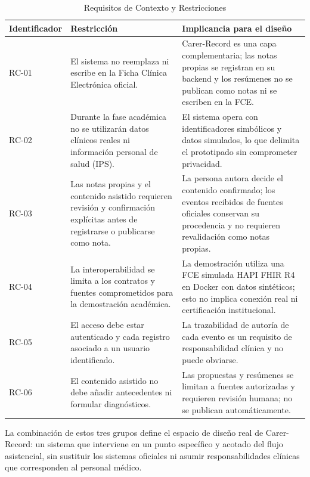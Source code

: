\begin{table}[H]
\caption{Requisitos de Contexto y Restricciones}
\label{tab:restricciones_contexto}
\begin{tabularx}{\textwidth}{|l|X|X|}
\hline
Identificador & \textbf{Restricción} & \textbf{Implicancia para el diseño} \\
\hline
RC-01 & El sistema no reemplaza ni escribe en la Ficha Clínica Electrónica oficial. & Carer-Record es una capa complementaria; las notas propias se registran en su backend y los resúmenes no se publican como notas ni se escriben en la FCE. \\
\hline
RC-02 & Durante la fase académica no se utilizarán datos clínicos reales ni información personal de salud (IPS). & El sistema opera con identificadores simbólicos y datos simulados, lo que delimita el prototipado sin comprometer privacidad. \\
\hline
RC-03 & Las notas propias y el contenido asistido requieren revisión y confirmación explícitas antes de registrarse o publicarse como nota. & La persona autora decide el contenido confirmado; los eventos recibidos de fuentes oficiales conservan su procedencia y no requieren revalidación como notas propias. \\
\hline
RC-04 & La interoperabilidad se limita a los contratos y fuentes comprometidos para la demostración académica. & La demostración utiliza una FCE simulada HAPI FHIR R4 en Docker con datos sintéticos; esto no implica conexión real ni certificación institucional. \\
\hline
RC-05 & El acceso debe estar autenticado y cada registro asociado a un usuario identificado. & La trazabilidad de autoría de cada evento es un requisito de responsabilidad clínica y no puede obviarse. \\
\hline
RC-06 & El contenido asistido no debe añadir antecedentes ni formular diagnósticos. & Las propuestas y resúmenes se limitan a fuentes autorizadas y requieren revisión humana; no se publican automáticamente. \\
\hline
\end{tabularx}
\end{table}

La combinación de estos tres grupos define el espacio de diseño real de Carer-Record: un sistema que interviene en un punto específico y acotado del flujo asistencial, sin sustituir los sistemas oficiales ni asumir responsabilidades clínicas que corresponden al personal médico.
